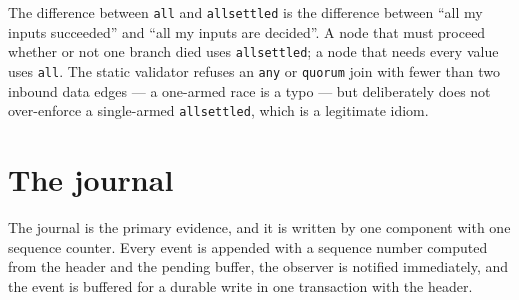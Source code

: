 The difference between \texttt{all} and \texttt{allsettled} is the difference between \enquote{all
my inputs succeeded} and \enquote{all my inputs are decided}. A node that must proceed whether or
not one branch died uses \texttt{allsettled}; a node that needs every value uses \texttt{all}. The
static validator refuses an \texttt{any} or \texttt{quorum} join with fewer than two inbound data
edges --- a one-armed race is a typo --- but deliberately does not over-enforce a single-armed
\texttt{allsettled}, which is a legitimate idiom.

\begin{center}
\end{center}

\section{The journal}

The journal is the primary evidence, and it is written by one component with one sequence counter.
Every event is appended with a sequence number computed from the header and the pending buffer, the
observer is notified immediately, and the event is buffered for a durable write in one transaction
with the header.

